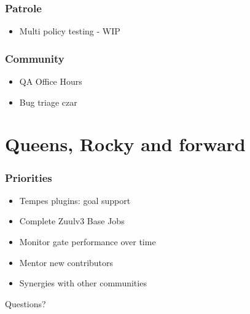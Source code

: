 \documentclass[aspectratio=169,11pt,hyperref={colorlinks=true}]{beamer}
\begin{document}
\begin{frame}
    \frametitle{Patrole}
    \begin{itemize}
        \item{Multi policy testing - WIP}
    \end{itemize}
\end{frame}

\begin{frame}
    \frametitle{Community}
    \begin{itemize}
        \item{QA Office Hours}
        \item{Bug triage czar}
    \end{itemize}
\end{frame}

\section{Queens, Rocky and forward}
\begin{frame}
    \frametitle{Priorities}
    \begin{itemize}
        \item{Tempes plugins: goal support}
	\item{Complete Zuulv3 Base Jobs}
        \item{Monitor gate performance over time}
        \item{Mentor new contributors}
        \item{Synergies with other communities}
    \end{itemize}
\end{frame}

\begin{frame}[c]
    \begin{center}
        \Huge Questions?
    \end{center}
\end{frame}

\end{document}
